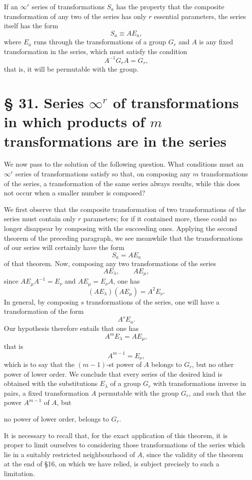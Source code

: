 \documentclass[11pt]{book}
\begin{document}
If an $\infty^r$ series of transformations $S_a$ has the property that the composite transformation of any two of the series has only $r$ essential parameters, the series itself has the form
\[
 S_a\equiv AE_a,
\]
where $E_a$ runs through the transformations of a group $G_r$ and $A$ is any fixed transformation in the series, which must satisfy the condition
\[
 A^{-1}G_rA=G_r,
\]
that is, it will be permutable with the group.

\section*{\S{} 31. Series $\infty^r$ of transformations in which products of $m$ transformations are in the series}

We now pass to the solution of the following question. What conditions must an $\infty^r$ series of transformations satisfy so that, on composing any $m$ transformations of the series, a transformation of the same series always results, while this does not occur when a smaller number is composed?

We first observe that the composite transformation of two transformations of the series must contain only $r$ parameters; for if it contained more, these could no longer disappear by composing with the succeeding ones. Applying the second theorem of the preceding paragraph, we see meanwhile that the transformations of our series will certainly have the form
\[
 S_a=AE_a
\]
of that theorem. Now, composing any two transformations of the series
\[
 AE_\lambda,
 \qquad
 AE_\mu,
\]
since $AE_\mu A^{-1}=E_\nu$ and $AE_\mu=E_\nu A$, one has
\[
 (AE_\lambda)(AE_\mu)=A^2E_\nu.
\]
In general, by composing $s$ transformations of the series, one will have a transformation of the form
\[
 A^sE_a.
\]
Our hypothesis therefore entails that one has
\[
 A^mE_\lambda=AE_\mu,
\]
that is
\[
 A^{m-1}=E_\nu,
\]
which is to say that the $(m-1)$-st power of $A$ belongs to $G_r$, but no other power of lower order. We conclude that every series of the desired kind is obtained with the substitutions $E_\lambda$ of a group $G_r$ with transformations inverse in pairs, a fixed transformation $A$ permutable with the group $G_r$, and such that the power $A^{m-1}$ of $A$, but

no power of lower order, belongs to $G_r$.

It is necessary to recall that, for the exact application of this theorem, it is proper to limit ourselves to considering those transformations of the series which lie in a suitably restricted neighbourhood of $A$, since the validity of the theorem at the end of \S{}16, on which we have relied, is subject precisely to such a limitation.
\end{document}

